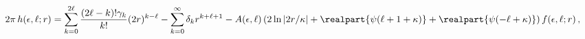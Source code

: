\[2\pi\mathop{h\/}\nolimits\!\left(\epsilon,\ell;r\right)={\sum_{k=0}^{2\ell}%
\frac{(2\ell-k)!\gamma_{k}}{k!}(2r)^{k-\ell}-\sum_{k=0}^{\infty}\delta_{k}r^{k%
+\ell+1}}-A(\epsilon,\ell)\left(2\mathop{\ln\/}\nolimits|2r/\kappa|+\realpart{%
\mathop{\psi\/}\nolimits\!\left(\ell+1+\kappa\right)}+\realpart{\mathop{\psi\/%
}\nolimits\!\left(-\ell+\kappa\right)}\right){\mathop{f\/}\nolimits\!\left(%
\epsilon,\ell;r\right),}\]